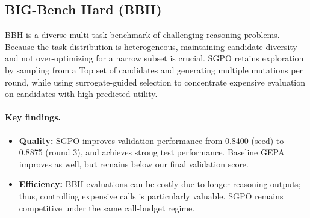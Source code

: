 \begin{table}[H]
\centering
\small
\caption{Comparison between Original GEPA and SGPO (\textit{PUPA}).}
\label{tab:pupa}
\end{table}

\subsection{BIG-Bench Hard (BBH)}
BBH is a diverse multi-task benchmark of challenging reasoning problems. Because the task distribution is heterogeneous, maintaining candidate diversity and not over-optimizing for a narrow subset is crucial. SGPO retains exploration by sampling from a Top set of candidates and generating multiple mutations per round, while using surrogate-guided selection to concentrate expensive evaluation on candidates with high predicted utility.

\paragraph{Key findings.}
\begin{itemize}
    \item \textbf{Quality:} SGPO improves validation performance from 0.8400 (seed) to 0.8875 (round 3), and achieves strong test performance. Baseline GEPA improves as well, but remains below our final validation score.
    \item \textbf{Efficiency:} BBH evaluations can be costly due to longer reasoning outputs; thus, controlling expensive calls is particularly valuable. SGPO remains competitive under the same call-budget regime.
\end{itemize}

